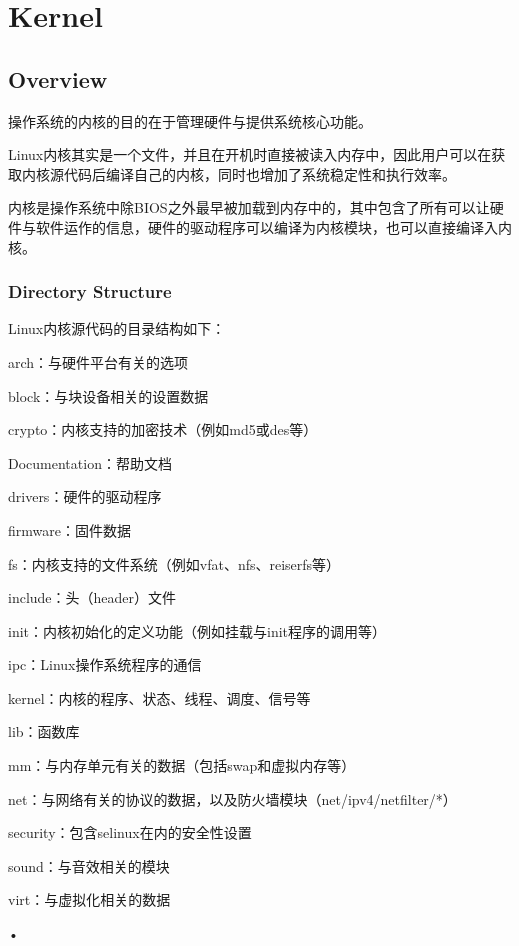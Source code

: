 \part{Kernel}

\chapter{Overview}

操作系统的内核的目的在于管理硬件与提供系统核心功能。



Linux内核其实是一个文件，并且在开机时直接被读入内存中，因此用户可以在获取内核源代码后编译自己的内核，同时也增加了系统稳定性和执行效率。

内核是操作系统中除BIOS之外最早被加载到内存中的，其中包含了所有可以让硬件与软件运作的信息，硬件的驱动程序可以编译为内核模块，也可以直接编译入内核。


\section{Directory Structure}


Linux内核源代码的目录结构如下：

\begin{compactitem}
\item arch：与硬件平台有关的选项
\item block：与块设备相关的设置数据
\item crypto：内核支持的加密技术（例如md5或des等）
\item Documentation：帮助文档
\item drivers：硬件的驱动程序
\item firmware：固件数据
\item fs：内核支持的文件系统（例如vfat、nfs、reiserfs等）
\item include：头（header）文件
\item init：内核初始化的定义功能（例如挂载与init程序的调用等）
\item ipc：Linux操作系统程序的通信
\item kernel：内核的程序、状态、线程、调度、信号等
\item lib：函数库
\item mm：与内存单元有关的数据（包括swap和虚拟内存等）
\item net：与网络有关的协议的数据，以及防火墙模块（net/ipv4/netfilter/*）
\item security：包含selinux在内的安全性设置
\item sound：与音效相关的模块
\item virt：与虚拟化相关的数据
\item 
\end{compactitem}•